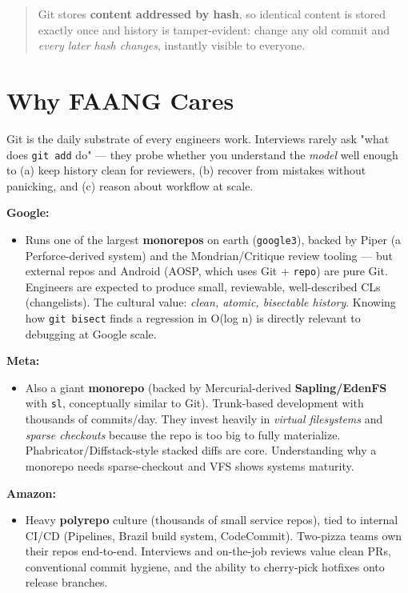 \documentclass[11pt]{article}
\providecommand{\tightlist}{\setlength{\itemsep}{1pt}\setlength{\parskip}{0pt}}
\begin{document}
\begin{quote}
Git stores \textbf{content addressed by hash}, so identical content is stored exactly once and history is tamper-evident: change any old commit and \emph{every later hash changes}, instantly visible to everyone.
\end{quote}

\section{Why FAANG Cares}\label{why-faang-cares}

Git is the daily substrate of every engineer\textquotesingle s work. Interviews rarely ask "what does \texttt{git\ add} do" --- they probe whether you understand the \emph{model} well enough to (a) keep history clean for reviewers, (b) recover from mistakes without panicking, and (c) reason about workflow at scale.

\textbf{Google:}

\begin{itemize}
\tightlist
\item
  Runs one of the largest \textbf{monorepos} on earth (\texttt{google3}), backed by Piper (a Perforce-derived system) and the Mondrian/Critique review tooling --- but external repos and Android (AOSP, which uses Git + \texttt{repo}) are pure Git. Engineers are expected to produce small, reviewable, well-described CLs (changelists). The cultural value: \emph{clean, atomic, bisectable history}. Knowing how \texttt{git\ bisect} finds a regression in O(log n) is directly relevant to debugging at Google scale.
\end{itemize}

\textbf{Meta:}

\begin{itemize}
\tightlist
\item
  Also a giant \textbf{monorepo} (backed by Mercurial-derived \textbf{Sapling/EdenFS} with \texttt{sl}, conceptually similar to Git). Trunk-based development with thousands of commits/day. They invest heavily in \emph{virtual filesystems} and \emph{sparse checkouts} because the repo is too big to fully materialize. Phabricator/Diffstack-style stacked diffs are core. Understanding why a monorepo needs sparse-checkout and VFS shows systems maturity.
\end{itemize}

\textbf{Amazon:}

\begin{itemize}
\tightlist
\item
  Heavy \textbf{polyrepo} culture (thousands of small service repos), tied to internal CI/CD (Pipelines, Brazil build system, CodeCommit). Two-pizza teams own their repos end-to-end. Interviews and on-the-job reviews value clean PRs, conventional commit hygiene, and the ability to cherry-pick hotfixes onto release branches.
\end{itemize}
\end{document}
